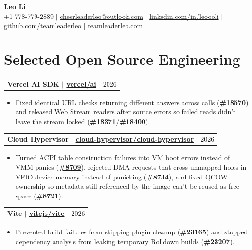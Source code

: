 \documentclass[letterpaper,11pt]{article}
\makeatletter
\newcommand{\resumeHeadingSimple}[2]{%
  \begin{tabularx}{\textwidth}{@{}Xr@{}}
    \textbf{#1} & #2
  \end{tabularx}\vspace{-1pt}
}
\newcommand{\resumeItemListStart}{\begin{itemize}[leftmargin=0.23in,itemsep=0.4pt,parsep=0pt,topsep=0.5pt]}
\newcommand{\resumeItem}[1]{\item\fontsize{9.9pt}{11.1pt}\selectfont #1}
\newcommand{\resumeItemListEnd}{\end{itemize}\vspace{-1.25pt}}
\makeatother
\begin{document}
\begin{center}
  {\Huge\textbf{Leo Li}} \\[2pt]
  \small
  +1 778-779-2889 $|$
  \href{mailto:cheerleaderleo@outlook.com}{cheerleaderleo@outlook.com} $|$
  \href{https://www.linkedin.com/in/leoooli/}{linkedin.com/in/leoooli} $|$
  \href{https://github.com/teamleaderleo}{github.com/teamleaderleo} $|$
  \href{https://teamleaderleo.com/}{teamleaderleo.com}
\end{center}
\vspace{-10pt}

\section{Selected Open Source Engineering}

\resumeHeadingSimple
  {Vercel AI SDK $|$ \href{https://redirect.github.com/vercel/ai}{vercel/ai}}
  {2026}
\resumeItemListStart
  \resumeItem{Fixed identical URL checks returning different answers across calls (\href{https://redirect.github.com/vercel/ai/pull/18570}{\textbf{\#18570}}) and released Web Stream readers after source errors so failed reads didn't leave the stream locked (\href{https://redirect.github.com/vercel/ai/pull/18371}{\textbf{\#18371}}/\href{https://redirect.github.com/vercel/ai/pull/18400}{\textbf{\#18400}}).}
\resumeItemListEnd

\resumeHeadingSimple
  {Cloud Hypervisor $|$ \href{https://redirect.github.com/cloud-hypervisor/cloud-hypervisor}{cloud-hypervisor/cloud-hypervisor}}
  {2026}
\resumeItemListStart
  \resumeItem{Turned ACPI table construction failures into VM boot errors instead of VMM panics (\href{https://redirect.github.com/cloud-hypervisor/cloud-hypervisor/pull/8709}{\textbf{\#8709}}), rejected DMA requests that cross unmapped holes in VFIO device memory instead of panicking (\href{https://redirect.github.com/cloud-hypervisor/cloud-hypervisor/pull/8734}{\textbf{\#8734}}), and fixed QCOW ownership so metadata still referenced by the image can't be reused as free space (\href{https://redirect.github.com/cloud-hypervisor/cloud-hypervisor/pull/8721}{\textbf{\#8721}}).}
\resumeItemListEnd

\resumeHeadingSimple
  {Vite $|$ \href{https://redirect.github.com/vitejs/vite}{vitejs/vite}}
  {2026}
\resumeItemListStart
  \resumeItem{Prevented build failures from skipping plugin cleanup (\href{https://redirect.github.com/vitejs/vite/pull/23165}{\textbf{\#23165}}) and stopped dependency analysis from leaking temporary Rolldown builds (\href{https://redirect.github.com/vitejs/vite/pull/23207}{\textbf{\#23207}}).}
\resumeItemListEnd
\end{document}
